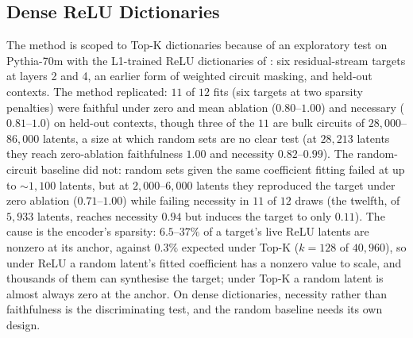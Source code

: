 \documentclass[10pt]{article}
\begin{document}
\subsection{Dense ReLU Dictionaries}
\label{app:dense-relu}
The method is scoped to Top-K dictionaries because of an exploratory test on Pythia-70m with the L1-trained ReLU dictionaries of \citet{marks2025sparse}: six residual-stream targets at layers 2 and 4, an earlier form of weighted circuit masking, and held-out contexts.
The method replicated: $11$ of $12$ fits (six targets at two sparsity penalties) were faithful under zero and mean ablation ($0.80$--$1.00$) and necessary ($0.81$--$1.0$) on held-out contexts, though three of the $11$ are bulk circuits of $28{,}000$--$86{,}000$ latents, a size at which random sets are no clear test (at $28{,}213$ latents they reach zero-ablation faithfulness $1.00$ and necessity $0.82$--$0.99$).
The random-circuit baseline did not: random sets given the same coefficient fitting failed at up to ${\sim}1{,}100$ latents, but at $2{,}000$--$6{,}000$ latents they reproduced the target under zero ablation ($0.71$--$1.00$) while failing necessity in $11$ of $12$ draws (the twelfth, of $5{,}933$ latents, reaches necessity $0.94$ but induces the target to only $0.11$).
The cause is the encoder's sparsity: $6.5$--$37\%$ of a target's live ReLU latents are nonzero at its anchor, against $0.3\%$ expected under Top-K ($k = 128$ of $40{,}960$), so under ReLU a random latent's fitted coefficient has a nonzero value to scale, and thousands of them can synthesise the target; under Top-K a random latent is almost always zero at the anchor.
On dense dictionaries, necessity rather than faithfulness is the discriminating test, and the random baseline needs its own design.

\end{document}
